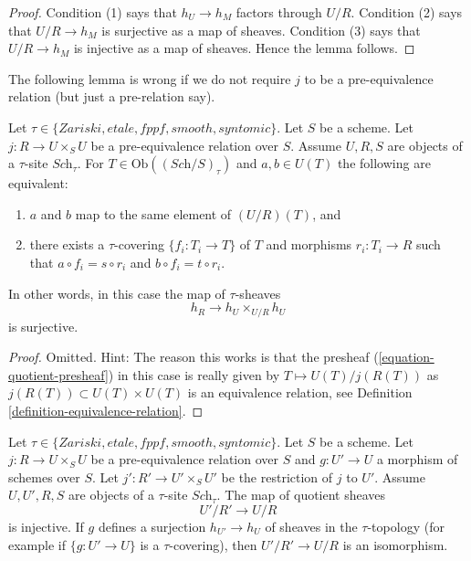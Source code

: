 \begin{proof}
Condition (1) says that $h_U \to h_M$ factors through $U/R$.
Condition (2) says that $U/R \to h_M$ is surjective as a map of sheaves.
Condition (3) says that $U/R \to h_M$ is injective as a map of sheaves.
Hence the lemma follows.
\end{proof}

\noindent
The following lemma is wrong if we do not require $j$ to be a
pre-equivalence relation (but just a pre-relation say).

\begin{lemma}
\label{lemma-quotient-pre-equivalence}
Let $\tau \in \{Zariski, etale, fppf, smooth, syntomic\}$.
Let $S$ be a scheme.
Let $j : R \to U \times_S U$ be a pre-equivalence relation over $S$.
Assume $U, R, S$ are objects of a $\tau$-site $\textit{Sch}_\tau$.
For $T \in \text{Ob}((\textit{Sch}/S)_\tau)$ and
$a, b \in U(T)$ the following are equivalent:
\begin{enumerate}
\item $a$ and $b$ map to the same element of $(U/R)(T)$, and
\item there exists a $\tau$-covering $\{f_i : T_i \to T\}$ of $T$
and morphisms $r_i : T_i \to R$ such that
$a \circ f_i = s \circ r_i$ and $b \circ f_i = t \circ r_i$.
\end{enumerate}
In other words, in this case the map of $\tau$-sheaves
$$
h_R \longrightarrow h_U \times_{U/R} h_U
$$
is surjective.
\end{lemma}

\begin{proof}
Omitted. Hint: The reason this works is that the presheaf
(\ref{equation-quotient-presheaf}) in this case is really given
by $T \mapsto U(T)/j(R(T))$ as $j(R(T)) \subset U(T) \times U(T)$
is an equivalence relation, see 
Definition \ref{definition-equivalence-relation}.
\end{proof}

\begin{lemma}
\label{lemma-quotient-pre-equivalence-relation-restrict}
Let $\tau \in \{Zariski, etale, fppf, smooth, syntomic\}$.
Let $S$ be a scheme.
Let $j : R \to U\times_S U$ be a pre-equivalence relation over $S$
and $g : U' \to U$ a morphism of schemes over $S$.
Let $j' : R' \to U' \times_S U'$ be the restriction of $j$ to $U'$. 
Assume  $U, U', R, S$ are objects of a $\tau$-site $\textit{Sch}_\tau$.
The map of quotient sheaves
$$
U'/R' \longrightarrow U/R
$$
is injective. If $g$ defines a surjection $h_{U'} \to h_U$ of sheaves
in the $\tau$-topology (for example if $\{g : U' \to U\}$ is a
$\tau$-covering), then $U'/R' \to U/R$ is an isomorphism.
\end{lemma}

